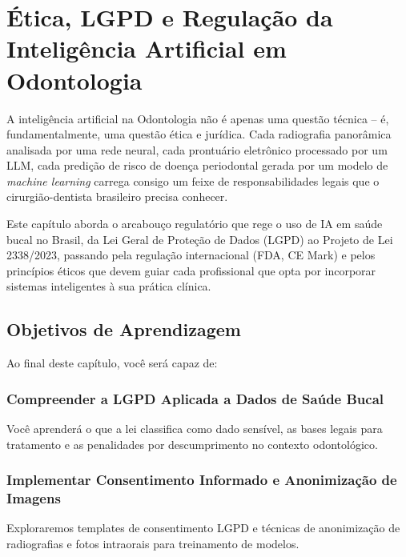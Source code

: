\chapter{Ética, LGPD e Regulação da Inteligência Artificial em Odontologia}
\label{cap:etica-lgpd-regulacao}

\nivelcinco

A inteligência artificial na Odontologia não é apenas uma questão técnica --
é, fundamentalmente, uma questão ética e jurídica. Cada radiografia panorâmica
analisada por uma rede neural, cada prontuário eletrônico processado por um
LLM, cada predição de risco de doença periodontal gerada por um modelo de
\textit{machine learning} carrega consigo um feixe de responsabilidades legais
que o cirurgião-dentista brasileiro precisa conhecer.

Este capítulo aborda o arcabouço regulatório que rege o uso de IA em saúde
bucal no Brasil, da Lei Geral de Proteção de Dados (LGPD) ao Projeto de Lei
2338/2023, passando pela regulação internacional (FDA, CE Mark) e pelos
princípios éticos que devem guiar cada profissional que opta por incorporar
sistemas inteligentes à sua prática clínica.

   

\section{Objetivos de Aprendizagem}

Ao final deste capítulo, você será capaz de:

\subsection{Compreender a LGPD Aplicada a Dados de Saúde Bucal}
Você aprenderá o que a lei classifica como dado sensível, as bases legais para tratamento e as penalidades por descumprimento no contexto odontológico.

\subsection{Implementar Consentimento Informado e Anonimização de Imagens}
Exploraremos templates de consentimento LGPD e técnicas de anonimização de radiografias e fotos intraorais para treinamento de modelos.

